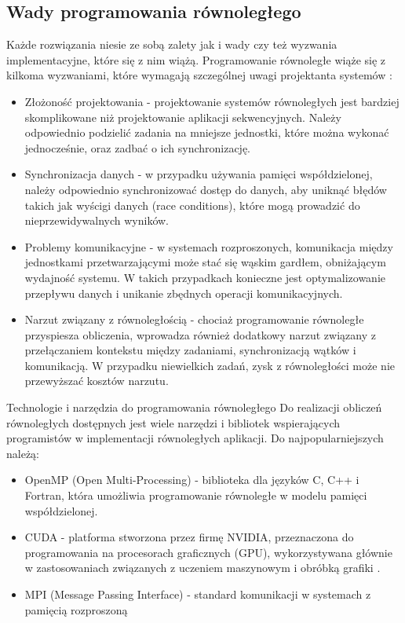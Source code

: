 \subsection{Wady programowania równoległego}
Każde rozwiązania niesie ze sobą zalety jak i wady czy też wyzwania implementacyjne, które się z nim wiążą. Programowanie równoległe wiąże się z kilkoma wyzwaniami, które wymagają szczególnej uwagi projektanta systemów \cite{ParallelProgramming, CUDA}:
\begin{itemize}
    \item Złożoność projektowania - projektowanie systemów równoległych jest bardziej skomplikowane niż projektowanie aplikacji sekwencyjnych. Należy odpowiednio podzielić zadania na mniejsze jednostki, które można wykonać jednocześnie, oraz zadbać o ich synchronizację.
    \item Synchronizacja danych - w przypadku używania pamięci współdzielonej, należy odpowiednio synchronizować dostęp do danych, aby uniknąć błędów takich jak wyścigi danych (race conditions), które mogą prowadzić do nieprzewidywalnych wyników.
    \item Problemy komunikacyjne - w systemach rozproszonych, komunikacja między jednostkami przetwarzającymi może stać się wąskim gardłem, obniżającym wydajność systemu. W takich przypadkach konieczne jest optymalizowanie przepływu danych i unikanie zbędnych operacji komunikacyjnych.
    \item Narzut związany z równoległością - chociaż programowanie równoległe przyspiesza obliczenia, wprowadza również dodatkowy narzut związany z przełączaniem kontekstu między zadaniami, synchronizacją wątków i komunikacją. W przypadku niewielkich zadań, zysk z równoległości może nie przewyższać kosztów narzutu.
\end{itemize}



Technologie i narzędzia do programowania równoległego
Do realizacji obliczeń równoległych dostępnych jest wiele narzędzi i bibliotek wspierających programistów w implementacji równoległych aplikacji. Do najpopularniejszych należą:
\begin{itemize}
    \item OpenMP (Open Multi-Processing) - biblioteka dla języków C, C++ i Fortran, która umożliwia programowanie równoległe w modelu pamięci współdzielonej. \cite{ParallelProgramminginC++withOpenMP, ProgramminInOpenMp}
    \item CUDA - platforma stworzona przez firmę NVIDIA, przeznaczona do programowania na procesorach graficznych (GPU), wykorzystywana głównie w zastosowaniach związanych z uczeniem maszynowym i obróbką grafiki \cite{CUDA}.
    \item MPI (Message Passing Interface) - standard komunikacji w systemach z pamięcią rozproszoną
\end{itemize}




